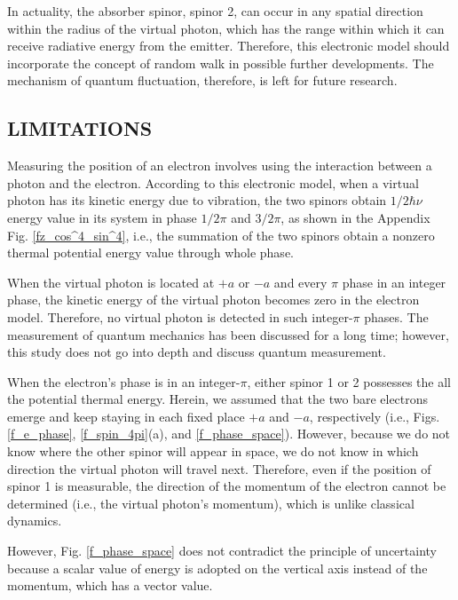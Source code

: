 \documentclass[reprint,amsmath,amssymb,aps,]{revtex4-1}
\numberwithin{equation}{section}%
\begin{document}
    In actuality, the absorber spinor, spinor 2, can occur in any spatial direction within the radius of the virtual photon, which has the range within which it can receive radiative energy from the emitter. Therefore, this electronic model should incorporate the concept of random walk in possible further developments. The mechanism of quantum fluctuation, therefore, is left for future research.


\subsection{\label{sec:LIMITATIONS}LIMITATIONS}
    
    Measuring the position of an electron involves using the interaction between a photon and the electron. According to this electronic model, when a virtual photon has its kinetic energy due to vibration, the two spinors obtain $1/2 \hbar \nu$ energy value in its system in phase $1/2 \pi$ and $3/2 \pi$, as shown in the Appendix Fig. \ref{fz_cos^4_sin^4}, i.e., the summation of the two spinors obtain a nonzero thermal potential energy value through whole phase.
    
    When the virtual photon is located at $+a$ or $-a$ and every $\pi$ phase in an integer phase, the kinetic energy of the virtual photon becomes zero in the electron model. Therefore, no virtual photon is detected in such integer-$\pi$ phases. The measurement of quantum mechanics has been discussed for a long time; however, this study does not go into depth and discuss quantum measurement.

    When the electron's phase is in an integer-$\pi$, either spinor 1 or 2 possesses the all the potential thermal energy. Herein, we assumed that the two bare electrons emerge and keep staying in each fixed place $+a$ and $-a$, respectively (i.e., Figs. \ref{f_e_phase}, \ref{f_spin_4pi}(a), and \ref{f_phase_space}). However, because we do not know where the other spinor will appear in space, we do not know in which direction the virtual photon will travel next. Therefore, even if the position of spinor 1 is measurable, the direction of the momentum of the electron cannot be determined (i.e., the virtual photon's momentum), which is unlike classical dynamics.
    
    However, Fig. \ref{f_phase_space} does not contradict the principle of uncertainty because a scalar value of energy is adopted on the vertical axis instead of the momentum, which has a vector value.
    
\end{document}

